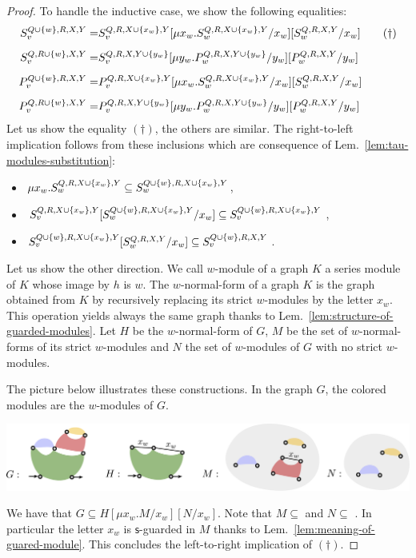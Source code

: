 \begin{proof}
  To handle the inductive case, we show the following equalities:
\begin{align*}
S^{Q\cup\left\{w\right\},R,X,Y}_v=&S^{Q,R,X\cup\left\{x_w\right\},Y}_v[\mu x_w. S^{Q,R,X\cup\left\{x_w\right\},Y}_w/x_w][S^{Q,R,X,Y}_w/x_w]\qquad (\dagger)\\[5pt]
S^{Q,R\cup\left\{w\right\},X,Y}_v=&S^{Q,R,X,Y\cup\left\{y_w\right\}}_v[\mu y_w. P^{Q,R,X,Y\cup\left\{y_w\right\}}_w/y_w][P^{Q,R,X,Y}_w/y_w]\\[5pt]
P^{Q\cup\left\{w\right\},R,X,Y}_v=&P^{Q,R,X\cup\left\{x_w\right\},Y}_v[\mu x_w. S^{Q,R,X\cup\left\{x_w\right\},Y}_w/x_w][S^{Q,R,X,Y}_w/x_w]\\[5pt]
P^{Q,R\cup\left\{w\right\},X,Y}_v=&P^{Q,R,X,Y\cup\left\{y_w\right\}}_v[\mu y_w. P^{Q,R,X,Y\cup\left\{y_w\right\}}_w/y_w][P^{Q,R,X,Y}_w/y_w]
\end{align*}
Let us show the  equality $(\dagger)$, the others are similar. The right-to-left implication follows from these inclusions which are consequence of Lem.~\ref{lem:tau-modules-substitution}:

\begin{itemize}
\item $\mu x_w. S^{Q,R,X\cup\left\{x_w\right\},Y}_w\subseteq S^{Q\cup\left\{w\right\},R,X\cup\left\{x_w\right\},Y}_w$,\\[-5pt]
\item $S^{Q,R,X\cup\left\{x_w\right\},Y}_v[S^{Q\cup\left\{w\right\},R,X\cup\left\{x_w\right\},Y}_w/x_w]\subseteq S^{Q\cup\left\{w\right\},R,X\cup\left\{x_w\right\},Y}_v$,\\[-5pt]
\item $S^{Q\cup\left\{w\right\},R,X\cup\left\{x_w\right\},Y}_v[S^{Q,R,X,Y}_w/x_w]\subseteq S^{Q\cup\left\{w\right\},R,X,Y}_v$.
\end{itemize}

Let us show the other direction. We call $w$-module of a graph $K$ a series module of $K$ whose image by $h$ is $w$. The $w$-normal-form of a graph $K$ is the graph obtained from $K$ by recursively replacing its strict $w$-modules by the letter $x_w$. This operation yields always the same graph thanks to Lem.~\ref{lem:structure-of-guarded-modules}.   
 Let $H$ be the $w$-normal-form of $G$, $M$ be the set of $w$-normal-forms of its strict $w$-modules and $N$ the set of $w$-modules of $G$ with no strict $w$-modules.
 
 
 The picture below illustrates these constructions. In the graph $G$, the colored modules are the $w$-modules of $G$. 
 \begin{center}
 \includegraphics[scale=.3]{Pictures/proof-rec->reg-dom-free}
\end{center}
We have that $G\subseteq H[\mu x_w. M/x_w][N/x_w]$. Note that 
$M\subseteq $  and $N\subseteq$ . In particular the letter $x_w$ is $\mathsf{s}$-guarded in $M$ thanks to Lem.~\ref{lem:meaning-of-guared-module}. This concludes the left-to-right implication of $(\dagger)$.
\medskip


\end{proof}

